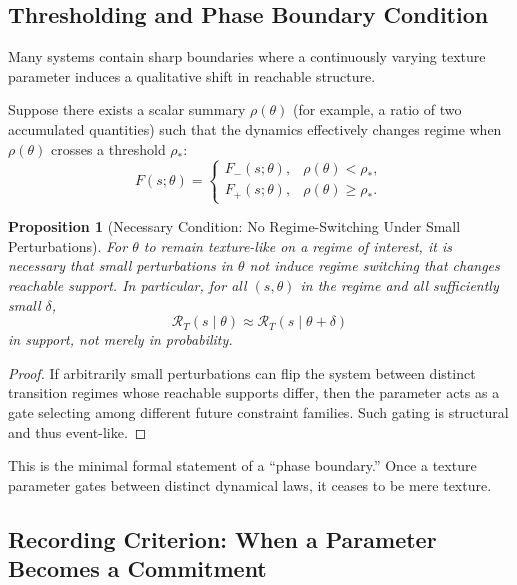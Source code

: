 \documentclass[11pt]{article}
\newtheorem{proposition}{Proposition}
\begin{document}
\subsection{Thresholding and Phase Boundary Condition}

Many systems contain sharp boundaries where a continuously varying texture
parameter induces a qualitative shift in reachable structure.

Suppose there exists a scalar summary $\rho(\theta)$ (for example, a ratio of
two accumulated quantities) such that the dynamics effectively changes regime
when $\rho(\theta)$ crosses a threshold $\rho_\ast$:
\begin{equation}
F(s;\theta) =
\begin{cases}
F_-(s;\theta), & \rho(\theta) < \rho_\ast,\\
F_+(s;\theta), & \rho(\theta) \ge \rho_\ast.
\end{cases}
\end{equation}

\begin{proposition}[Necessary Condition: No Regime-Switching Under Small Perturbations]
For $\theta$ to remain texture-like on a regime of interest, it is necessary
that small perturbations in $\theta$ not induce regime switching that changes
reachable support. In particular, for all $(s,\theta)$ in the regime and all
sufficiently small $\delta$,
\begin{equation}
\mathcal{R}_T(s \mid \theta) \approx \mathcal{R}_T(s \mid \theta+\delta)
\end{equation}
in support, not merely in probability.
\end{proposition}

\begin{proof}
If arbitrarily small perturbations can flip the system between distinct
transition regimes whose reachable supports differ, then the parameter acts as
a gate selecting among different future constraint families. Such gating is
structural and thus event-like.
\end{proof}

This is the minimal formal statement of a ``phase boundary.'' Once a texture
parameter gates between distinct dynamical laws, it ceases to be mere texture.

\subsection{Recording Criterion: When a Parameter Becomes a Commitment}
\end{document}
